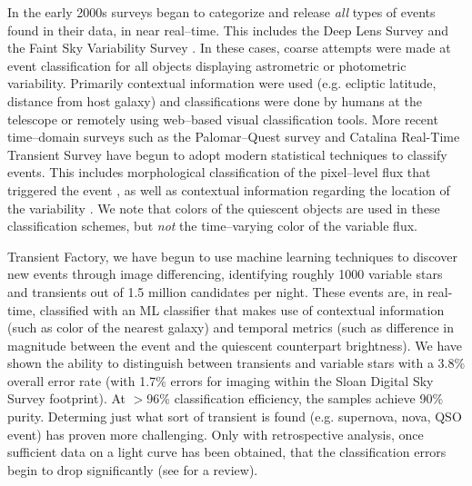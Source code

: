 
In the early 2000s surveys began to categorize and release {\it all} types of
events found in their data, in near real--time. This includes the Deep Lens
Survey \citep{Becker04a} and the Faint Sky Variability Survey
\citep{2003MNRAS.339..427G}.  In these cases, coarse attempts were made at event
classification for all objects displaying astrometric or photometric
variability. Primarily contextual information were used (e.g. ecliptic latitude,
distance from host galaxy) and classifications were done by humans at the
telescope or remotely using web--based visual classification tools.  More recent
time--domain surveys such as the Palomar--Quest survey
\citep{2008AN....329..263D} and Catalina Real-Time Transient Survey
\citep{2011arXiv1102.5004D} have begun to adopt modern statistical techniques to
classify events.  This includes morphological classification of the pixel--level
flux that triggered the event \citep{2008AIPC.1082..252D}, as well as contextual
information regarding the location of the variability
\citep{2010ASPC..434..115M}.  We note that colors of the quiescent objects are
used in these classification schemes, but {\it not} the time--varying color of
the variable flux.

Transient Factory, we have begun to use machine learning techniques to discover
new events through image differencing, identifying roughly 1000 variable stars
and transients out of 1.5 million candidates per night. These events are, in
real-time, classified with an ML classifier that makes use of contextual
information (such as color of the nearest galaxy) and temporal metrics (such as
difference in magnitude between the event and the quiescent counterpart
brightness). We have shown \citep{bloom}  the ability to  distinguish between
transients and variable stars with a 3.8\% overall error rate (with 1.7\% errors
for imaging within the Sloan Digital Sky Survey footprint). At $>$96\%
classification efficiency, the samples achieve 90\% purity. Determing just what
sort of transient is found (e.g. supernova, nova, QSO event) has proven more
challenging. Only with retrospective analysis, once sufficient data on a light
curve has been obtained, that the classification errors begin to drop
significantly \citep{rs} (see \citealt{rb} for a review).


